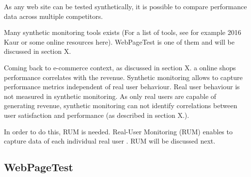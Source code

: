 As any web site can be tested synthetically, it is possible to compare performance data across multiple competitors. %



Many synthetic monitoring tools exists (For a list of tools, see for example 2016 Kaur or some online resources here).
WebPageTest is one of them and will be discussed in section X.



Coming back to e-commerce context, as discussed in section X.  a online shops performance correlates with the revenue.
Synthetic monitoring allows to capture performance metrics independent of real user behaviour.
Real user behaviour is not measured in synthetic monitoring.
As only real users are capable of generating revenue, synthetic monitoring can not identify correlations between user satisfaction and performance (as described in section X.).%

In order to do this, RUM is needed.
Real-User Monitoring (RUM) enables to capture data of each individual real user .
RUM will be discussed next.
















\subsection{WebPageTest}


